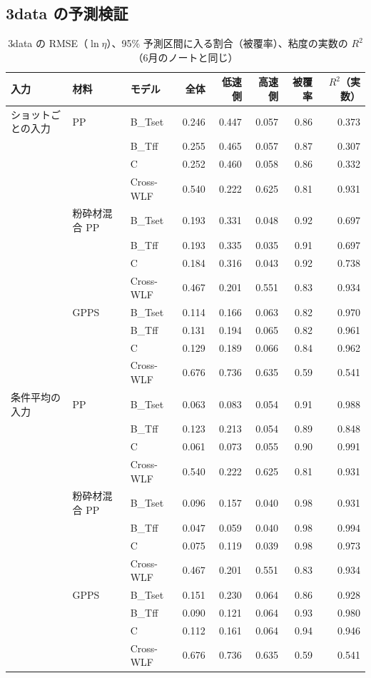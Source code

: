 \documentclass[paper=a4paper,fontsize=10.5pt,line_length=44zw,number_of_lines=38]{jlreq}
\begin{document}
\subsection{3data の予測検証}
\begin{table}[H]
\caption{3data の RMSE（$\ln\eta$）、95\% 予測区間に入る割合（被覆率）、粘度の実数の $R^2$（6月のノートと同じ）}\label{tab:met}
\scriptsize
\begin{tabularx}{\linewidth}{@{}lllrrrrr@{}}
\toprule
入力 & 材料 & モデル & 全体 & 低速側 & 高速側 & 被覆率 & $R^2$（実数） \\
\midrule
ショットごとの入力 & PP & B\_Tset & 0.246 & 0.447 & 0.057 & 0.86 & 0.373 \\
 &  & B\_Tff & 0.255 & 0.465 & 0.057 & 0.87 & 0.307 \\
 &  & C & 0.252 & 0.460 & 0.058 & 0.86 & 0.332 \\
 &  & Cross-WLF & 0.540 & 0.222 & 0.625 & 0.81 & 0.931 \\
\midrule
 & 粉砕材混合 PP & B\_Tset & 0.193 & 0.331 & 0.048 & 0.92 & 0.697 \\
 &  & B\_Tff & 0.193 & 0.335 & 0.035 & 0.91 & 0.697 \\
 &  & C & 0.184 & 0.316 & 0.043 & 0.92 & 0.738 \\
 &  & Cross-WLF & 0.467 & 0.201 & 0.551 & 0.83 & 0.934 \\
\midrule
 & GPPS & B\_Tset & 0.114 & 0.166 & 0.063 & 0.82 & 0.970 \\
 &  & B\_Tff & 0.131 & 0.194 & 0.065 & 0.82 & 0.961 \\
 &  & C & 0.129 & 0.189 & 0.066 & 0.84 & 0.962 \\
 &  & Cross-WLF & 0.676 & 0.736 & 0.635 & 0.59 & 0.541 \\
\midrule
条件平均の入力 & PP & B\_Tset & 0.063 & 0.083 & 0.054 & 0.91 & 0.988 \\
 &  & B\_Tff & 0.123 & 0.213 & 0.054 & 0.89 & 0.848 \\
 &  & C & 0.061 & 0.073 & 0.055 & 0.90 & 0.991 \\
 &  & Cross-WLF & 0.540 & 0.222 & 0.625 & 0.81 & 0.931 \\
\midrule
 & 粉砕材混合 PP & B\_Tset & 0.096 & 0.157 & 0.040 & 0.98 & 0.931 \\
 &  & B\_Tff & 0.047 & 0.059 & 0.040 & 0.98 & 0.994 \\
 &  & C & 0.075 & 0.119 & 0.039 & 0.98 & 0.973 \\
 &  & Cross-WLF & 0.467 & 0.201 & 0.551 & 0.83 & 0.934 \\
\midrule
 & GPPS & B\_Tset & 0.151 & 0.230 & 0.064 & 0.86 & 0.928 \\
 &  & B\_Tff & 0.090 & 0.121 & 0.064 & 0.93 & 0.980 \\
 &  & C & 0.112 & 0.161 & 0.064 & 0.94 & 0.946 \\
 &  & Cross-WLF & 0.676 & 0.736 & 0.635 & 0.59 & 0.541 \\

\bottomrule
\end{tabularx}
\end{table}
\end{document}
